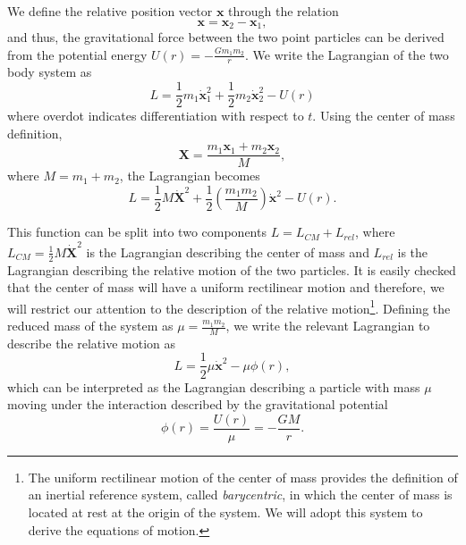 We define the relative position vector $\textbf{x}$ through the relation 
\begin{equation}
\textbf{x}=\textbf{x}_{2}-\textbf{x}_{1},
\end{equation}
and thus, the gravitational force between the two point particles can be derived from the potential energy $U\left( r \right) = -\frac{Gm_1 m _2}{r}$. We write the Lagrangian of the two body system as 
\begin{equation}
L=\frac{1}{2}m_{1}\dot{\textbf{x}}_{1}^{2}+\frac{1}{2}m_{2}\dot{\textbf{x}}_2^{2}-U\left( r \right)
\end{equation}
where overdot indicates differentiation with respect to $t$.
Using the center of mass definition,
\begin{equation}
\textbf{X}=\frac{m_{1}\textbf{x}_{1}+m_{2}\textbf{x}_{2}}{M},
\end{equation}
where $M=m_{1}+m_{2}$, the Lagrangian becomes
\begin{equation}
L=\frac{1}{2}M\dot{\textbf{X}}^{2}+\frac{1}{2}\left(\frac{m_{1}m_{2}}{M}\right)\dot{\textbf{x}}^{2}-U\left( r \right).
\end{equation}

This function can be split into two components $L=L_{CM}+L_{rel}$, where $L_{CM}=\frac{1}{2}M\dot{\textbf{X}}^{2}$ is the Lagrangian describing the center of mass and  $L_{rel}$ is the Lagrangian describing the relative  motion of the two particles. It is easily checked that the center of mass will have a uniform rectilinear motion and therefore, we will restrict our attention to the description of the relative motion\footnote{The uniform rectilinear motion of the center of mass provides the definition of an inertial reference system, called \textit{barycentric}, in which the center of mass is located at rest at the origin of the system. We will adopt this system to derive the equations of motion.}. Defining the reduced mass of the system as $\mu=\frac{m_{1}m_{2}}{M}$,  we write the relevant Lagrangian to describe the relative motion as
\begin{equation}
L=\frac{1}{2}\mu\dot{\textbf{x}}^{2} - \mu \phi(r), \label{eq:2BodyLagrangian}
\end{equation}
which can be interpreted as the Lagrangian describing a particle with mass
 $\mu$ moving under the interaction described by the gravitational potential
 \begin{equation}
 \phi(r) = \frac{U(r )}{\mu} = -\frac{GM}{r}.
 \end{equation}
 
